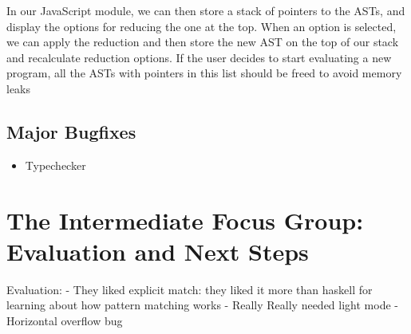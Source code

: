 In our JavaScript module, we can then store a stack of pointers to the \ac{AST}s, and display the options for reducing the one at the top. When an option is selected, we can apply the reduction and then store the new \ac{AST} on the top of our stack and recalculate reduction options. If the user decides to start evaluating a new program, all the \ac{AST}s with pointers in this list should be freed to avoid memory leaks 

\subsection{Major Bugfixes}
\begin{itemize}
    \item Typechecker
\end{itemize}

\section{The Intermediate Focus Group: Evaluation and Next Steps}
\label{eval:IFG}
Evaluation:
- They liked explicit match: they liked it more than haskell for learning about how pattern matching works
- Really Really needed light mode
- Horizontal overflow bug